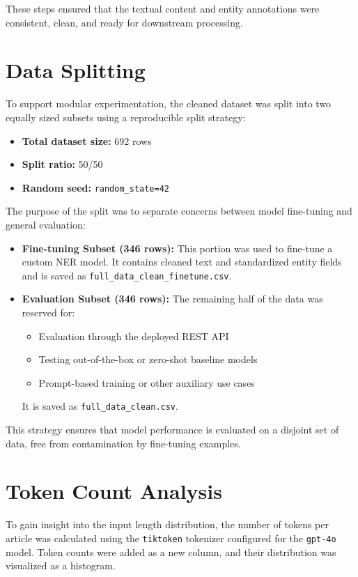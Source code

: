 These steps ensured that the textual content and entity annotations were consistent, clean, and ready for downstream processing.

\section{Data Splitting}

To support modular experimentation, the cleaned dataset was split into two equally sized subsets using a reproducible split strategy:

\begin{itemize}
  \item \textbf{Total dataset size:} 692 rows
  \item \textbf{Split ratio:} 50/50
  \item \textbf{Random seed:} \texttt{random\_state=42}
\end{itemize}

The purpose of the split was to separate concerns between model fine-tuning and general evaluation:

\begin{itemize}
  \item \textbf{Fine-tuning Subset (346 rows):} This portion was used to fine-tune a custom NER model. It contains cleaned text and standardized entity fields and is saved as \texttt{full\_data\_clean\_finetune.csv}.
  
  \item \textbf{Evaluation Subset (346 rows):} The remaining half of the data was reserved for:
    \begin{itemize}
      \item Evaluation through the deployed REST API
      \item Testing out-of-the-box or zero-shot baseline models
      \item Prompt-based training or other auxiliary use cases
    \end{itemize}
    It is saved as \texttt{full\_data\_clean.csv}.
\end{itemize}

This strategy ensures that model performance is evaluated on a disjoint set of data, free from contamination by fine-tuning examples.

\section{Token Count Analysis}

To gain insight into the input length distribution, the number of tokens per article was calculated using the \texttt{tiktoken} tokenizer configured for the \texttt{gpt-4o} model. Token counts were added as a new column, and their distribution was visualized as a histogram.


